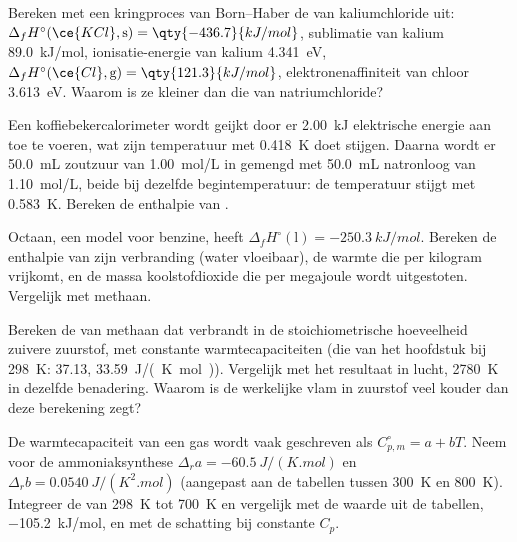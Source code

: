 \begin{exercise}[$\star\star$]\label{exo:b2:reaction-enthalpy:7}
Bereken met een kringproces van Born--Haber de  van
kaliumchloride uit: $\Delta_f H^\circ(\ce{KCl}, \text{s}) = \qty{-436.7}{kJ/mol}$,
sublimatie van kalium \qty{89.0}{kJ/mol}, ionisatie-energie van
kalium \qty{4.341}{eV}, $\Delta_f H^\circ(\ce{Cl}, \text{g}) =
\qty{121.3}{kJ/mol}$, elektronenaffiniteit van chloor \qty{3.613}{eV}. Waarom is
ze kleiner dan die van natriumchloride?
\end{exercise}

\begin{exercise}[$\star\star$]\label{exo:b2:reaction-enthalpy:8}
Een koffiebekercalorimeter wordt geijkt door er \qty{2.00}{kJ}
elektrische energie aan toe te voeren, wat zijn temperatuur met \qty{0.418}{K} doet stijgen. Daarna
wordt er \qty{50.0}{mL} zoutzuur van \qty{1.00}{mol/L} in gemengd
met \qty{50.0}{mL} natronloog van \qty{1.10}{mol/L},
beide bij dezelfde begintemperatuur: de temperatuur stijgt met
\qty{0.583}{K}. Bereken de enthalpie van .
\end{exercise}

\begin{exercise}[$\star\star$]\label{exo:b2:reaction-enthalpy:9}
Octaan, een model voor benzine, heeft $\Delta_f H^\circ(\text{l}) =
\qty{-250.3}{kJ/mol}$. Bereken de enthalpie van zijn verbranding (water
vloeibaar), de warmte die per kilogram vrijkomt, en de massa koolstofdioxide
die per megajoule wordt uitgestoten. Vergelijk met methaan.
\end{exercise}

\begin{exercise}[$\star\star\star$]\label{exo:b2:reaction-enthalpy:10}
Bereken de  van methaan dat verbrandt in de
stoichiometrische hoeveelheid zuivere zuurstof, met constante warmtecapaciteiten (die
van het hoofdstuk bij \qty{298}{K}:  37.13, 
\qty{33.59}{J/(K.mol)}). Vergelijk met het resultaat in lucht,
\qty{2780}{K} in dezelfde benadering. Waarom is de werkelijke vlam in zuurstof
veel kouder dan deze berekening zegt?
\end{exercise}

\begin{exercise}[$\star\star\star$]\label{exo:b2:reaction-enthalpy:11}
De warmtecapaciteit van een gas wordt vaak geschreven als $C_{p,m}^\circ = a + bT$. Neem voor
de ammoniaksynthese $\Delta_r a = \qty{-60.5}{J/(K.mol)}$ en
$\Delta_r b = \qty{0.0540}{J/(K^2.mol)}$ (aangepast aan de tabellen tussen
\qty{300}{K} en \qty{800}{K}). Integreer de  van
\qty{298}{K} tot \qty{700}{K} en vergelijk met de waarde uit de tabellen,
\qty{-105.2}{kJ/mol}, en met de schatting bij constante $C_p$.
\end{exercise}


